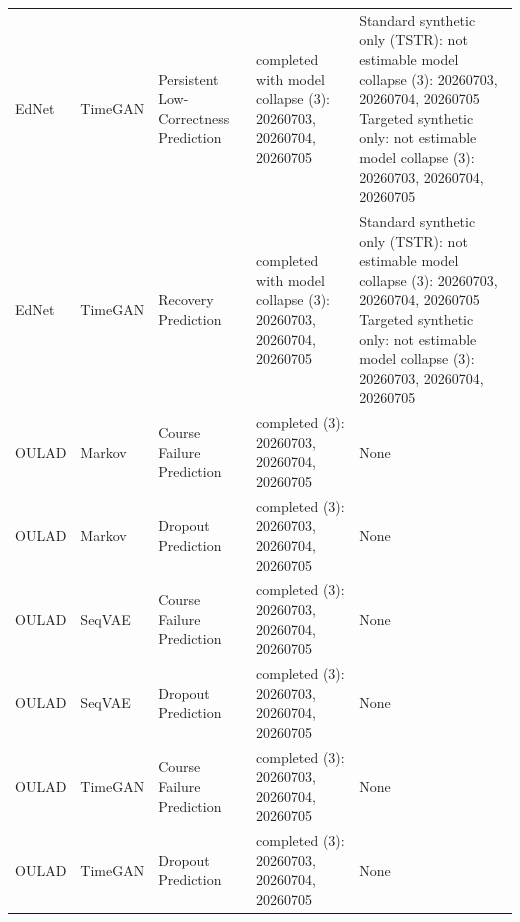 \begin{longtable}{@{}p{2.2cm}p{2.0cm}p{3.6cm}p{7.05cm}p{7.65cm}@{}}
EdNet & TimeGAN & Persistent Low-Correctness Prediction & completed with model collapse (3): 20260703, 20260704, 20260705 & Standard synthetic only (TSTR): not estimable model collapse (3): 20260703, 20260704, 20260705 Targeted synthetic only: not estimable model collapse (3): 20260703, 20260704, 20260705 \\
EdNet & TimeGAN & Recovery Prediction & completed with model collapse (3): 20260703, 20260704, 20260705 & Standard synthetic only (TSTR): not estimable model collapse (3): 20260703, 20260704, 20260705 Targeted synthetic only: not estimable model collapse (3): 20260703, 20260704, 20260705 \\
OULAD & Markov & Course Failure Prediction & completed (3): 20260703, 20260704, 20260705 & None \\
OULAD & Markov & Dropout Prediction & completed (3): 20260703, 20260704, 20260705 & None \\
OULAD & SeqVAE & Course Failure Prediction & completed (3): 20260703, 20260704, 20260705 & None \\
OULAD & SeqVAE & Dropout Prediction & completed (3): 20260703, 20260704, 20260705 & None \\
OULAD & TimeGAN & Course Failure Prediction & completed (3): 20260703, 20260704, 20260705 & None \\
OULAD & TimeGAN & Dropout Prediction & completed (3): 20260703, 20260704, 20260705 & None \\
\end{longtable}
